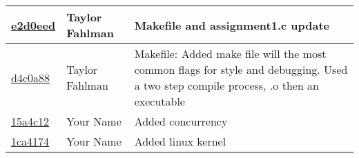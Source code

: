 \begin{tabular}{l l l}
\href{git@github.com:fahlmant/cs444/commit/e2d0eedfaec7397cf59d7f1fd46886026f0f1727}{e2d0eed} & Taylor Fahlman & Makefile and assignment1.c update\\\hline
\href{git@github.com:fahlmant/cs444/commit/d4c0a889450f5e33eeee262f56cea203a29aed0a}{d4c0a88} & Taylor Fahlman & Makefile:     Added make file will the most common flags for style and debugging. Used a two step compile process, .o then an executable\\\hline
\href{git@github.com:fahlmant/cs444/commit/15a4c12977816ab8bab1fe5f5a9b3c3774a8367a}{15a4c12} & Your Name & Added concurrency\\\hline
\href{git@github.com:fahlmant/cs444/commit/1ca41740bd9248799f23d5798a4a82d99e63ba5a}{1ca4174} & Your Name & Added linux kernel\\\hline\end{tabular}
